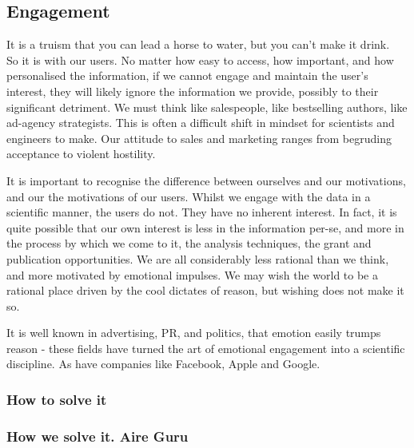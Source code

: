 \subsection{Engagement}
It is a truism that you can lead a horse to water, but you can't make it drink. \\

So it is with our users.
No matter how easy to access, how important, and how personalised the information, if we cannot engage and maintain the user's interest,
they will likely ignore the information we provide, possibly to their significant detriment.
We must think like salespeople, like bestselling authors, like ad-agency strategists.
This is often a difficult shift in mindset for scientists and engineers to make.
Our attitude to sales and marketing ranges from begruding acceptance to violent hostility.

It is important to recognise the difference between ourselves and our motivations, and our the motivations of our users. Whilst we engage with the data in a scientific
manner, the users do not. They have no inherent interest. In fact, it is quite possible that our own interest is less in the information per-se, and more in the process
by which we come to it, the analysis techniques, the grant and publication opportunities. We are all considerably less rational than we think, and more motivated by
emotional impulses. We may wish the world to be a rational place driven by the cool dictates of reason, but wishing does not make it so.

It is well known in advertising, PR, and politics, that emotion easily trumps reason - these fields have turned the art of emotional engagement into a scientific discipline.
As have companies like Facebook, Apple and Google.

\subsubsection{How to solve it}

\subsubsection{How we solve it. Aire Guru} 
\begin{itemize}
    \done
    \crossed
    
\end{itemize}
\newpage